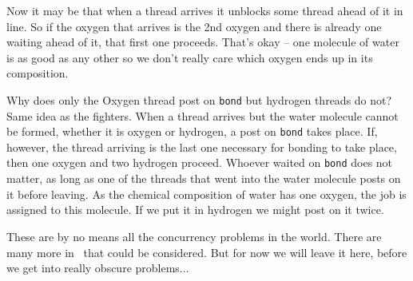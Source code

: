 Now it may be that when a thread arrives it unblocks some thread ahead of it in line. So if the oxygen that arrives is the 2nd oxygen and there is already one waiting ahead of it, that first one proceeds. That's okay -- one molecule of water is as good as any other so we don't really care which oxygen ends up in its composition.

Why does only the Oxygen thread post on \texttt{bond} but hydrogen threads do not? Same idea as the fighters. When a thread arrives but the water molecule cannot be formed, whether it is oxygen or hydrogen, a post on \texttt{bond} takes place. If, however, the thread arriving is the last one necessary for bonding to take place, then one oxygen and two hydrogen proceed. Whoever waited on \texttt{bond} does not matter, as long as one of the threads that went into the water molecule posts on it before leaving. As the chemical composition of water has one oxygen, the job is assigned to this molecule. If we put it in hydrogen we might post on it twice.

These are by no means all the concurrency problems in the world. There are many more in~\cite{lbs} that could be considered. But for now we will leave it here, before  we get into really obscure problems...



